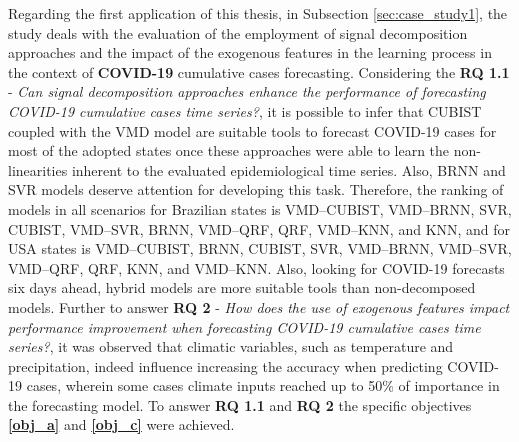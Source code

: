 Regarding the first application of this thesis, in Subsection \ref{sec:case_study1}, the study deals with the evaluation of the employment of signal decomposition approaches and the impact of the exogenous features in the learning process in the context of \textbf{COVID-19} cumulative cases forecasting. Considering the \textbf{RQ 1.1} - \textit{Can signal decomposition approaches enhance the performance of forecasting \ac{COVID-19} cumulative cases time series?}, it is possible to infer that \ac{CUBIST} coupled with the \ac{VMD} model are suitable tools to forecast \ac{COVID-19} cases for most of the adopted states once these approaches were able to learn the non-linearities inherent to the evaluated epidemiological time series. Also, \ac{BRNN} and \ac{SVR} models deserve attention for developing this task. Therefore, the ranking of models in all scenarios for Brazilian states is \ac{VMD}--\ac{CUBIST}, \ac{VMD}--\ac{BRNN}, \ac{SVR}, \ac{CUBIST}, \ac{VMD}--\ac{SVR}, \ac{BRNN}, \ac{VMD}--\ac{QRF}, \ac{QRF}, \ac{VMD}--\ac{KNN}, and \ac{KNN}, and for \ac{USA} states is \ac{VMD}--\ac{CUBIST}, \ac{BRNN}, \ac{CUBIST}, \ac{SVR}, \ac{VMD}--\ac{BRNN}, \ac{VMD}--\ac{SVR}, \ac{VMD}--\ac{QRF}, \ac{QRF}, \ac{KNN}, and \ac{VMD}--\ac{KNN}. Also, looking for \ac{COVID-19} forecasts six days ahead, hybrid models are more suitable tools than non-decomposed models. Further to answer \textbf{RQ 2} - \textit{How does the use of exogenous features impact performance improvement when forecasting \ac{COVID-19} cumulative cases time series?}, it was observed that climatic variables, such as temperature and precipitation, indeed influence increasing the accuracy when predicting \ac{COVID-19} cases, wherein some cases climate inputs reached up to 50\% of importance in the forecasting model. To answer \textbf{RQ 1.1} and \textbf{RQ 2} the specific objectives \textbf{\ref{obj_a}} and \textbf{\ref{obj_c}} were achieved.

